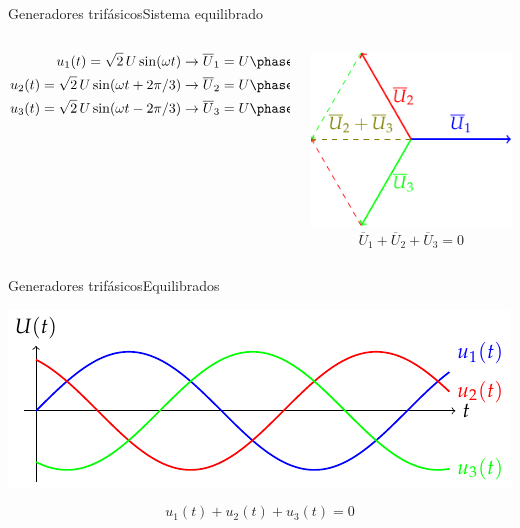 \documentclass[aspectratio=169, xcolor={usenames,svgnames,dvipsnames}]{beamer}
\begin{document}
\begin{frame}{Generadores trifásicos}{Sistema equilibrado}
\begin{columns}
\begin{column}{0.6\columnwidth}
\begin{align*}
  u_1(t) = \sqrt{2}\, U \sin(\omega t) & \rightarrow \overline{U}_1 = U\phase{0}\\
  u_2(t) = \sqrt{2}\, U \sin(\omega t + 2\pi/3)& \rightarrow \overline{U}_2 = U\phase{120}\\
  u_3(t) = \sqrt{2}\, U \sin(\omega t - 2\pi/3) & \rightarrow \overline{U}_3 = U\phase{-120}
\end{align*}
\end{column}
\begin{column}{0.4\columnwidth}
\begin{center}
\includegraphics[height=0.5\textheight]{../figs/FasoresSumaCero.pdf}
\[
\boxed{\overline{U}_1 + \overline{U}_2 + \overline{U}_3 = 0}
\]
\end{center}
\end{column}
\end{columns}
\end{frame}

\begin{frame}{Generadores trifásicos}{Equilibrados}
\begin{center}
\includegraphics[width=.9\linewidth]{../figs/TensionesTrifasica.pdf}
\end{center}

\[
\boxed{u_1(t) + u_2(t) + u_3(t) = 0}
\]
\end{frame}
\end{document}
